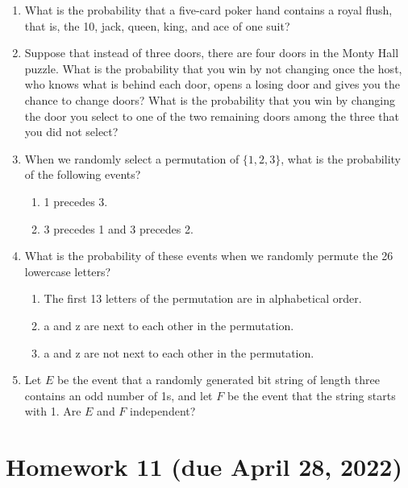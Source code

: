 \documentclass[11pt]{article}
\begin{document}
\begin{enumerate}
    \item What is the probability that a five-card poker hand contains a royal flush, that is, the 10, jack, queen, king, and ace of one suit?
    \item Suppose that instead of three doors, there are four doors in the Monty Hall puzzle. What is the probability that you win by not changing once the host, who knows what is behind each door, opens a losing door and gives you the chance to change doors? What is the probability that you win by changing the door you select to one of the two remaining doors among the three that you did not select?
    \item When we randomly select a permutation of $\{ 1, 2, 3 \}$, what is the probability of the following events?
    \begin{enumerate}
        \item 1 precedes 3.
        \item 3 precedes 1 and 3 precedes 2.
    \end{enumerate}
    \item What is the probability of these events when we randomly permute the 26 lowercase letters?
    \begin{enumerate}
        \item The first 13 letters of the permutation are in alphabetical order.
        \item a and z are next to each other in the permutation.
        \item a and z are not next to each other in the permutation.
    \end{enumerate}
    \item Let $E$ be the event that a randomly generated bit string of length three contains an odd number of 1s, and let $F$ be the event that the string starts with 1. Are $E$ and $F$ independent?
\end{enumerate}

\section*{Homework 11 (due April 28, 2022)}
\end{document}
